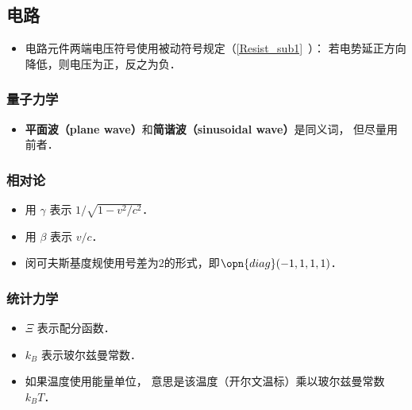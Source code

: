 \subsection{电路}
\begin{itemize}
\item 电路元件两端电压符号使用被动符号规定（\autoref{Resist_sub1}~）： 若电势延正方向降低，则电压为正，反之为负．
\end{itemize}

\subsubsection{量子力学}
\begin{itemize}
\item \textbf{平面波（plane wave）}和\textbf{简谐波（sinusoidal wave）}是同义词， 但尽量用前者．
\end{itemize}

\subsubsection{相对论}
\begin{itemize}
\item 用 $\gamma$ 表示 $1/\sqrt{1 - v^2/c^2}$．
\item 用 $\beta$ 表示 $v/c$．
\item 闵可夫斯基度规使用号差为$2$的形式，即$\opn{diag}(-1, 1, 1, 1)$．
\end{itemize}

\subsubsection{统计力学}
\begin{itemize}
\item $\Xi$ 表示配分函数．
\item $k_B$ 表示玻尔兹曼常数．
\item 如果温度使用能量单位， 意思是该温度（开尔文温标）乘以玻尔兹曼常数 $k_B T$．
\end{itemize}

